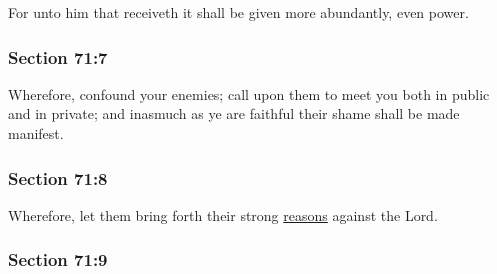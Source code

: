 		For unto him that receiveth it shall be given more abundantly, even power.


	\subsubsection{Section 71:7} %
		\label{DC71-7}

		Wherefore, confound your enemies; call upon them to meet you both in public and in private; and inasmuch as ye are faithful their shame shall be made manifest.


	\subsubsection{Section 71:8} %
		\label{DC71-8}

		Wherefore, let them bring forth their strong \hyperref[REASON]{reasons} against the Lord.


	\subsubsection{Section 71:9} %
		\label{DC71-9}

